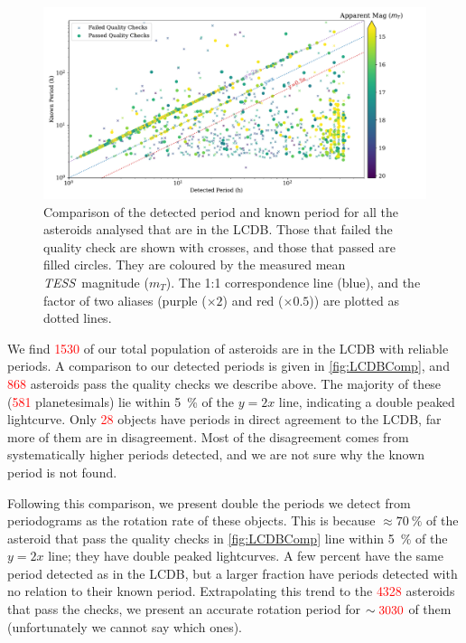 \documentclass[12pt]{article}
\newcommand{\tess}{\textit{TESS}}
\newcommand{\red}[1]{\textcolor{red}{#1}}
\begin{document}
\begin{figure}
    \centering
    \includegraphics[width=\textwidth]{LCDBCompTotalPaperFigDraft.pdf}
    \caption{Comparison of the detected period and known period for all the asteroids analysed that are in the LCDB.
        Those that failed the quality check are shown with crosses, and those that passed are filled circles. They are coloured by the measured mean \tess\ magnitude ($m_T$).
        The 1:1 correspondence line (blue), and the factor of two aliases (purple ($\times 2$) and red ($\times 0.5$)) are plotted as dotted lines.
    }
    \label{fig:LCDBComp}
\end{figure}


We find \red{1530} of our total population of asteroids are in the LCDB with reliable periods. 
A comparison to our detected periods is given in \autoref{fig:LCDBComp}, and \red{868} asteroids pass the quality checks we describe above. 
The majority of these (\red{581} planetesimals) lie within \qty{5}{\percent} of the $y=2x$ line, indicating a double peaked lightcurve.
Only \red{28} objects have periods in direct agreement to the LCDB, far more of them are in disagreement. 
Most of the disagreement comes from systematically higher periods detected, and we are not sure why the known period is not found. 

Following this comparison, we present double the periods we detect from periodograms as the rotation rate of these objects.
This is because $\approx \qty{70}{\percent}$ of the asteroid that pass the quality checks in \autoref{fig:LCDBComp} line within \qty{5}{\percent} of the $y=2x$ line; they have double peaked lightcurves.
A few percent have the same period detected as in the LCDB, but a larger fraction have periods detected with no relation to their known period.
Extrapolating this trend to the \red{4328} asteroids that pass the checks, we present an accurate rotation period for $\sim \red{3030}$ of them (unfortunately we cannot say which ones).
\end{document}
